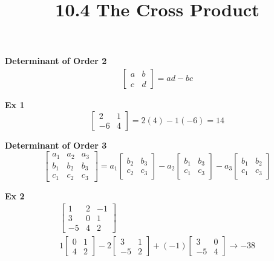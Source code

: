 \documentclass{article}
\title{10.4 The Cross Product}
\begin{document}
  \maketitle
  \textbf{Determinant of Order 2}
  \[
    \begin{gathered}
    \begin{bmatrix}
      a & b\\
      c & d
    \end{bmatrix} = ad - bc
    \end{gathered}
  \]

  \textbf{Ex 1}
  \[
    \begin{bmatrix}
      2 &1\\
      -6 &4
    \end{bmatrix} = 2(4) -1(-6) = \boxed{14}
  \]

  \textbf{Determinant of Order 3}
  \[
    \begin{bmatrix}
      a_1 &a_2  &a_3\\
      b_1 &b_2 &b_3\\
      c_1 &c_2 &c_3
    \end{bmatrix} = 
    a_1 \begin{bmatrix}
      b_2 &b_3\\
      c_2 &c_3
    \end{bmatrix}
    - a_2 \begin{bmatrix}
      b_1 &b_3\\
      c_1 &c_3
    \end{bmatrix} -
    a_3 \begin{bmatrix}
     b_1 &b_2\\
     c_1 &c_3
    \end{bmatrix}
  \] 

  \textbf{Ex 2}
  \[
    \begin{gathered}
    \begin{bmatrix}
      1 &2 &-1\\
      3 &0 &1\\
      -5 &4 &2
    \end{bmatrix}\\
    1 \begin{bmatrix}
      0 &1\\
      4 &2
    \end{bmatrix} -
    2 \begin{bmatrix}
      3 &1\\
      -5 &2
    \end{bmatrix} +
    (-1) \begin{bmatrix}
      3 &0\\
      -5 &4
    \end{bmatrix}\to \boxed{-38}
    \end{gathered}
  \]
\end{document}
